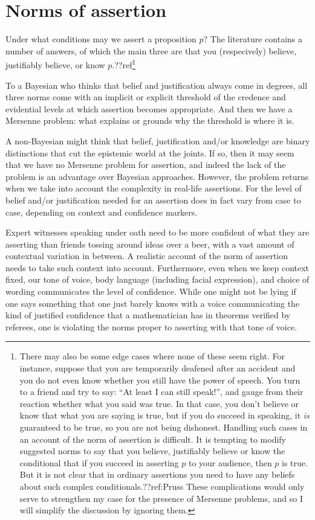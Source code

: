 \section{Norms of assertion}
Under what conditions may we assert a proposition $p$? The literature contains a number of answers, of which the main 
three are that you (respecively) believe, justifiably believe, or know $p$.??ref\footnote{There may also be some edge cases where none 
of these seem right. For instance, suppose that you are temporarily deafened after an accident and you do not even know whether 
you still have the power of speech. You turn to a friend and try to say: ``At least I can still speak!'', and gauge from 
their reaction whether what you said was true. In that case, you don't believe or know that what you are saying is true, but 
if you do succeed in speaking, it \textit{is} guaranteed to be true, so you are not being dishonest. Handling such cases in 
an account of the norm of assertion is difficult. It is tempting to modify suggested norms to say that you believe, 
justifiably believe or know the conditional that if you succeed in asserting $p$ to your audience, then $p$ is true. But it is 
not clear that in ordinary assertions you need to have any beliefs about such complex conditionals.??ref:Pruss These complications
would only serve to strengthen my case for the presence of Mersenne problems, and so I will simplify the discussion by ignoring them.}

To a Bayesian who thinks that belief and justification always come in degrees, all three norms come with an implicit or 
explicit threshold of the credence and evidential levels at which assertion becomes appropriate. And then we have a 
Mersenne problem: what explains or grounds why the threshold is where it is.

A non-Bayesian might think that belief, justification and/or knowledge are binary distinctions that cut the epistemic 
world at the joints. If so, then it may seem that we have no Mersenne problem for assertion, and indeed the lack of the 
problem is an advantage over Bayesian approaches. However, the problem returns when we take into account the complexity
in real-life assertions. For the level of belief and/or justification needed for an assertion does in fact vary from case to 
case, depending on context and confidence markers. 

Expert witnesses speaking under oath need to be more confident of what they are asserting than friends tossing around 
ideas over a beer, with a vast amount of contextual variation in between. A realistic account of the norm of assertion 
needs to take such context into account. Furthermore, even when we keep context fixed, our tone of voice, body language (including
facial expression), and choice of wording communicates the level of confidence. While one might not be lying if one says something that one 
just barely knows with a voice communicating the kind of justified confidence that a mathematician has in theorems verified
by referees, one is violating the norms proper to asserting with that tone of voice. 

